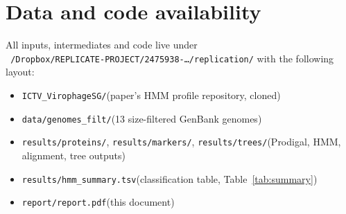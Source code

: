 \documentclass[11pt,a4paper]{article}
\begin{document}
\section{Data and code availability}

All inputs, intermediates and code live under\\
\texttt{\string~/Dropbox/REPLICATE-PROJECT/2475938-\ldots/replication/}
with the following layout:
\begin{itemize}[leftmargin=1.4em]
\item \texttt{ICTV\_VirophageSG/}\hfill (paper's HMM profile repository, cloned)
\item \texttt{data/genomes\_filt/}\hfill (13 size-filtered GenBank genomes)
\item \texttt{results/proteins/}, \texttt{results/markers/},
      \texttt{results/trees/}\hfill (Prodigal, HMM, alignment, tree outputs)
\item \texttt{results/hmm\_summary.tsv}\hfill (classification table,
                                               Table~\ref{tab:summary})
\item \texttt{report/report.pdf}\hfill (this document)
\end{itemize}
\end{document}
